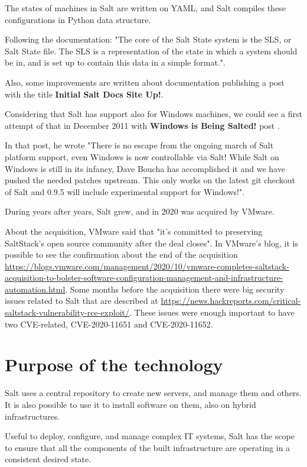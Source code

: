 \documentclass[12pt,a4paper,openright,twoside]{book}
\begin{document}
The states of machines in Salt are written on YAML, and Salt compiles these configurations in Python data structure.


Following the documentation: "The core of the Salt State system is the SLS, or Salt State file. The SLS is a representation of the state in which a system should be in, and is set up to contain this data in a simple format."\cite{saltDocSLS}.

Also, some improvements are written about documentation publishing a post with the title \textbf{Initial Salt Docs Site Up!}\cite{saltPost}.


Considering that Salt has support also for Windows machines, we could see a first attempt of that in December 2011 with \textbf{Windows is Being Salted!} post \cite{saltPost2}.


In that post, he wrote "There is no escape from the ongoing march of Salt platform support, even Windows is now controllable via Salt! While Salt on Windows is still in its infancy, Dave Boucha has accomplished it and we have pushed the needed patches upstream. This only works on the latest git checkout of Salt and 0.9.5 will include experimental support for Windows!"\cite{saltPost2}.

During years after years, Salt grew, and in 2020 was acquired by VMware.

About the acquisition, VMware said that "it's committed to preserving SaltStack's open source community after the deal closes"\cite{saltAcq}.
In VMware's blog, it is possible to see the confirmation about the end of the acquisition \url{https://blogs.vmware.com/management/2020/10/vmware-completes-saltstack-acquisition-to-bolster-software-configuration-management-and-infrastructure-automation.html}.
Some months before the acquisition there were big security issues related to Salt that are described at \url{https://news.hackreports.com/critical-saltstack-vulnerability-rce-exploit/}.
These issues were enough important to have two CVE-related, CVE-2020-11651 and CVE-2020-11652.

\section{Purpose of the technology}
Salt uses a central repository to create new servers, and manage them and others. It is also possible to use it to install software on them, also on hybrid infrastructures.


Useful to deploy, configure, and manage complex IT systems, Salt has the scope to ensure that all the components of the built infrastructure are operating in a consistent desired state.
\end{document}
